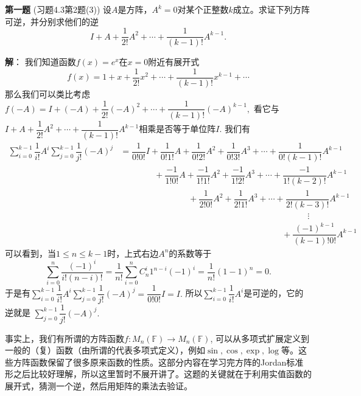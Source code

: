 
\date{2022-11-18 第六次习题课}
\author{}



\maketitle


{\bf 第一题} (习题4.3第2题(3)) 设$A$是方阵，$A^k = 0$对某个正整数$k$成立。求证下列方阵可逆，并分别求他们的逆
$$I + A + \dfrac{1}{2!}A^2 + \cdots + \dfrac{1}{(k-1)!}A^{k-1}.$$

\ifIncludeAnswer

\newpageorvspace

{\bf 解}： 我们知道函数$f(x) = e^x$在$x = 0$附近有展开式
$$f(x) = 1 + x + \dfrac{1}{2!}x^2 + \cdots + \dfrac{1}{(k-1)!}x^{k-1} + \cdots$$
那么我们可以类比考虑$f(-A) = I + (-A) + \dfrac{1}{2!}(-A)^2 + \cdots + \dfrac{1}{(k-1)!}(-A)^{k-1},$ 看它与$I + A + \dfrac{1}{2!}A^2 + \cdots + \dfrac{1}{(k-1)!}A^{k-1}$相乘是否等于单位阵$I.$ 我们有
\begin{align*}
\sum\limits_{i=0}^{k-1} \dfrac{1}{i!} A^i \sum\limits_{j=0}^{k-1} \dfrac{1}{j!} (-A)^j & = \dfrac{1}{0!0!} I + \dfrac{1}{0!1!} A + \dfrac{1}{0!2!} A^2 + \dfrac{1}{0!3!} A^3 + \cdots + \dfrac{1}{0!(k-1)!} A^{k-1} \\
& \hspace{4em} + \dfrac{-1}{1!0!} A + \dfrac{-1}{1!1!} A^2 + \dfrac{-1}{1!2!} A^3 + \cdots + \dfrac{-1}{1!(k-2)!} A^{k-1} \\
& \hspace{8em} + \dfrac{1}{2!0!} A^2 + \dfrac{1}{2!1!} A^3 + \cdots + \dfrac{1}{2!(k-3)!} A^{k-1} \\
& \hspace{22em} \vdots \\
& \hspace{19em} + \dfrac{(-1)^{k-1}}{(k-1)!0!} A^{k-1}
\end{align*}
可以看到，当$1\leqslant n \leqslant k-1$时，上式右边$A^n$的系数等于
$$\sum\limits_{i=0}^n \dfrac{(-1)^i}{i!(n-i)!} = \dfrac{1}{n!} \sum\limits_{i=0}^n C_n^i 1^{n-i} (-1)^i = \dfrac{1}{n!} (1-1)^n = 0.$$
于是有$\sum\limits_{i=0}^{k-1} \dfrac{1}{i!} A^i \sum\limits_{j=0}^{k-1} \dfrac{1}{j!} (-A)^j = \dfrac{1}{0!0!} I = I.$ 所以$\sum\limits_{i=0}^{k-1} \dfrac{1}{i!} A^i$是可逆的，它的逆就是 $\sum\limits_{j=0}^{k-1} \dfrac{1}{j!} (-A)^j.$

事实上，我们有所谓的方阵函数$f: M_n(\mathbb{F}) \to M_n(\mathbb{F})$, 可以从多项式扩展定义到一般的（复）函数（由所谓的代表多项式定义），例如$\sin, \cos, \exp, \log$等。这些方阵函数保留了很多原来函数的性质。这部分内容在学习完方阵的Jordan标准形之后比较好理解，所以这里暂时不展开讲了。这题的关键就在于利用实值函数的展开式，猜测一个逆，然后用矩阵的乘法去验证。


